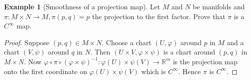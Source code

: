 \documentclass[reqno]{amsart}
\theoremstyle{plain}%
\theoremstyle{definition}
\newtheorem{example}[theorem]{Example}
\theoremstyle{remark}
\begin{document}
\begin{example}[Smoothness of a projection map]
    Let $M$ and $N$ be manifolds and $\pi  \colon
    M \times N \to M, \pi\left( p,q \right) =p$ the projection
    to the first factor. Prove that $\pi$ is a $C^{\infty}$ map.
\end{example}

\begin{proof}
    Suppose $\left( p,q \right) \in M \times N$. 
    Choose a chart  $\left( U, \varphi \right) $ around $p$ in
    $M$ and a chart $\left( V, \psi \right) $ around $q$ in $N$.
    Then $\left( U \times V, \varphi \times \psi \right) $ is
    a chart around $\left( p,q \right) $ in $M \times N$.
    Now $\varphi \circ \pi \circ \left( \varphi \times \psi \right)^{-1}
     \colon \varphi (U) \times \psi (V) \to \mathbb{R}^{m}$ is the
     projection map onto the first coordinate on 
     $\varphi (U) \times \psi(V)$ which is $C^{\infty}$. Hence
     $\pi$ is $C^{\infty}$.
\end{proof}



\end{document}
